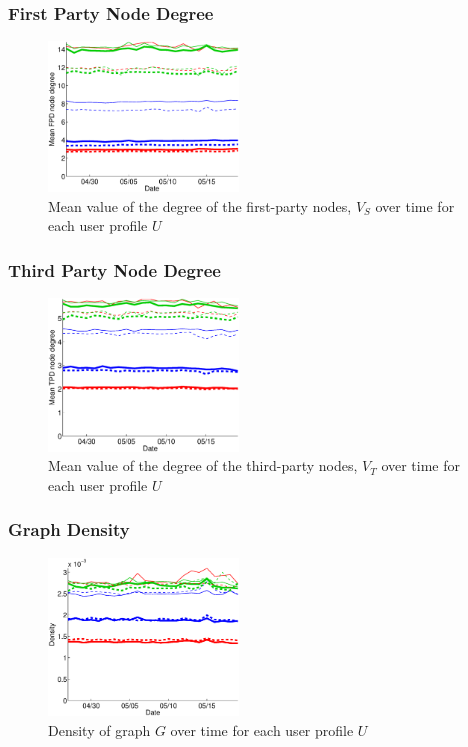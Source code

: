 \documentclass{sig-alternate}
\begin{document}
\subsubsection{First Party Node Degree}

\begin{figure}
  \centering
  \label{fig:first_means}
  \includegraphics[width=0.45\textwidth]{figures/plots/first-means.eps}
  \caption{Mean value of the degree of the first-party nodes, $V_S$ over time for each user profile $U$}
\end{figure}

\subsubsection{Third Party Node Degree}

\begin{figure}
  \centering
  \label{fig:third_means}
  \includegraphics[width=0.45\textwidth]{figures/plots/third-means.eps}
  \caption{Mean value of the degree of the third-party nodes, $V_T$ over time for each user profile $U$}
\end{figure}

\subsubsection{Graph Density}

\begin{figure}
  \centering
  \label{fig:density}
  \includegraphics[width=0.45\textwidth]{figures/plots/density.eps}
  \caption{Density of graph $G$ over time for each user profile $U$}
\end{figure}
\end{document}
